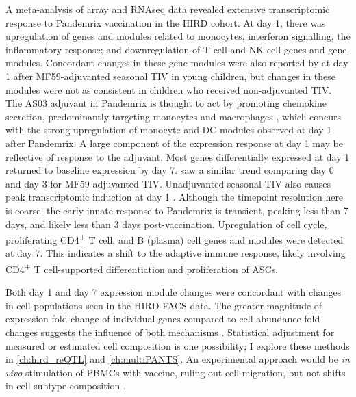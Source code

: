 A meta-analysis of array and \gls{RNAseq} data revealed extensive transcriptomic response to Pandemrix vaccination in the \gls{HIRD} cohort.
%
At day 1, there was
upregulation of genes and modules related to monocytes, interferon signalling, the inflammatory response;
and downregulation of T cell and \gls{NK} cell genes and gene modules.
Concordant changes in these gene modules were also reported by \textcite{nakaya2016SystemsBiologyImmunity} at day 1 after MF59-adjuvanted seasonal \gls{TIV} in young children, but changes in these modules were not as consistent in children who received non-adjuvanted \gls{TIV}.
The AS03 adjuvant in Pandemrix is thought to act by promoting chemokine secretion, predominantly targeting monocytes and macrophages \autocite{morel2011AdjuvantSystemAS03,wilkins2017AS03MF59AdjuvantedInfluenza}, which concurs with the strong upregulation of monocyte and \gls{DC} modules observed at day 1 after Pandemrix.
A large component of the expression response at day 1 may be reflective of response to the adjuvant.
%
Most genes differentially expressed at day 1 returned to baseline expression by day 7.
\textcite{nakaya2016SystemsBiologyImmunity} saw a similar trend comparing day 0 and day 3 for MF59-adjuvanted \gls{TIV}.
Unadjuvanted seasonal \gls{TIV} also causes peak transcriptomic induction at day 1 \autocite{bucasas2011EarlyPatternsGene}.
Although the timepoint resolution here is coarse,
the early innate response to Pandemrix is transient, peaking less than 7 days, and likely less than 3 days post-vaccination.
%
Upregulation of cell cycle, proliferating CD4\textsuperscript{+} T cell, and B (plasma) cell genes and modules were detected at day 7.
This indicates a shift to the adaptive immune response, likely involving CD4\textsuperscript{+} T cell-supported differentiation and proliferation of \glspl{ASC}.

Both day 1 and day 7 expression module changes were concordant with changes in cell populations seen in the \gls{HIRD} \gls{FACS} data.
The greater magnitude of expression fold change of individual genes compared to cell abundance fold changes suggests the influence of both mechanisms \autocite{sobolev2016AdjuvantedInfluenzaH1N1Vaccination}.
Statistical adjustment for measured or estimated cell composition is one possibility; I explore these methods in \cref{ch:hird_reQTL} and \cref{ch:multiPANTS}.
An experimental approach would be \textit{in vivo} stimulation of \glspl{PBMC} with vaccine, ruling out cell migration, but not shifts in cell subtype composition \autocite{querec2009SystemsBiologyApproach}.

